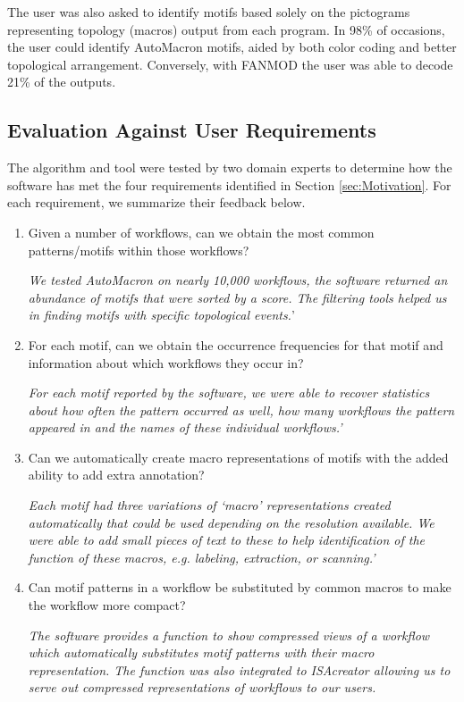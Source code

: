 The user was also asked to identify motifs based solely on the pictograms representing topology (macros) output from each program. In 98\% of occasions, the user could identify AutoMacron motifs, aided by both color coding and better topological arrangement. Conversely, with FANMOD the user was able to decode 21\% of the outputs. 

\subsection{Evaluation Against User Requirements}
%
The algorithm and tool were tested by two domain experts to determine how the software has met the four requirements identified in Section \ref{sec:Motivation}.
For each requirement, we summarize their feedback below.

\vspace{-2mm}
\begin{enumerate}[itemsep=-1mm]
\item Given a number of workflows, can we obtain the most common patterns/motifs within those workflows?
  
    \emph{We tested AutoMacron on nearly 10,000 workflows, the software returned an abundance of motifs that were sorted by a score. The filtering tools helped us in finding motifs with specific topological events.}'
  
\item For each motif, can we obtain the occurrence frequencies for that motif and information about which workflows they occur in?
  
    \emph{For each motif reported by the software, we were able to recover statistics about how often the pattern occurred as well, how many workflows the pattern appeared in and the names of these individual workflows.'}
  
\item Can we automatically create macro representations of motifs with the added ability to add extra annotation?
  
    \emph{Each motif had three variations of `macro' representations created automatically that could be used depending on the resolution available. We were able to add small pieces of text to these to help identification of the function of these macros, \emph{e.g.} labeling, extraction, or scanning.'}

\item Can motif patterns in a workflow be substituted by common macros to make the workflow more compact?
  
    \emph{The software provides a function to show compressed views of a workflow which automatically substitutes motif patterns with their macro representation. The function was also integrated to ISAcreator allowing us to serve out compressed representations of workflows to our users.}
\end{enumerate}

